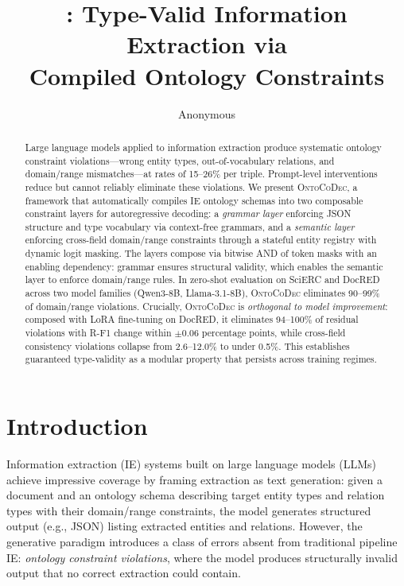 \documentclass[11pt,a4paper]{article}
\title{\sys{}: Type-Valid Information Extraction via\\Compiled Ontology Constraints}
\author{Anonymous}
\date{}
\newcommand{\sys}{\textsc{OntoCoDec}}
\begin{document}
\maketitle

\begin{abstract}

Large language models applied to information extraction produce systematic ontology constraint violations---wrong entity types, out-of-vocabulary relations, and domain/range mismatches---at rates of 15--26\% per triple.
Prompt-level interventions reduce but cannot reliably eliminate these violations.
We present \sys{}, a framework that automatically compiles IE ontology schemas into two composable constraint layers for autoregressive decoding: a \emph{grammar layer} enforcing JSON structure and type vocabulary via context-free grammars, and a \emph{semantic layer} enforcing cross-field domain/range constraints through a stateful entity registry with dynamic logit masking.
The layers compose via bitwise AND of token masks with an enabling dependency: grammar ensures structural validity, which enables the semantic layer to enforce domain/range rules.
In zero-shot evaluation on SciERC and DocRED across two model families (Qwen3-8B, Llama-3.1-8B), \sys{} eliminates 90--99\% of domain/range violations.
Crucially, \sys{} is \emph{orthogonal to model improvement}: composed with LoRA fine-tuning on DocRED, it eliminates 94--100\% of residual violations with R-F1 change within $\pm$0.06 percentage points, while cross-field consistency violations collapse from 2.6--12.0\% to under 0.5\%.
This establishes guaranteed type-validity as a modular property that persists across training regimes.

\end{abstract}

\section{Introduction}
\label{sec:intro}

Information extraction (IE) systems built on large language models (LLMs) achieve impressive coverage by framing extraction as text generation: given a document and an ontology schema describing target entity types and relation types with their domain/range constraints, the model generates structured output (e.g., JSON) listing extracted entities and relations.
However, the generative paradigm introduces a class of errors absent from traditional pipeline IE: \emph{ontology constraint violations}, where the model produces structurally invalid output that no correct extraction could contain.
\end{document}

